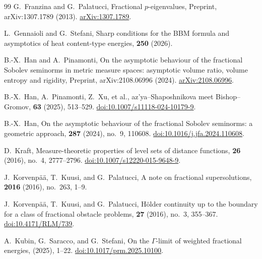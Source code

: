\documentclass[reqno,11pt]{amsart}
\numberwithin{equation}{section}
\theoremstyle{definition} %
\theoremstyle{plain}
\theoremstyle{definition}
\theoremstyle{remark}
\begin{document}
\begin{thebibliography}{99}
G.~Franzina and G.~Palatucci,
\newblock Fractional $p$-eigenvalues,
\newblock Preprint, arXiv:1307.1789 (2013).
\newblock \href{https://arxiv.org/abs/1307.1789}{arXiv:1307.1789}.

L.~Gennaioli and G.~Stefani,
\newblock Sharp conditions for the {BBM} formula and asymptotics of heat content-type energies,
 \textbf{250} (2026).


B.-X.~Han and A.~Pinamonti,
\newblock On the asymptotic behaviour of the fractional {S}obolev seminorms in metric measure spaces: asymptotic volume ratio, volume entropy and rigidity,
\newblock Preprint, arXiv:2108.06996 (2024).
\newblock \href{https://arxiv.org/abs/2108.06996}{arXiv:2108.06996}.

B.-X.~Han, A.~Pinamonti, Z.~Xu, et al.,
az'ya--{S}haposhnikova meet {B}ishop--{G}romov,
 \textbf{63} (2025), 513--529.
\newblock \href{https://doi.org/10.1007/s11118-024-10179-9}{doi:10.1007/s11118-024-10179-9}.

B.-X.~Han,
\newblock On the asymptotic behaviour of the fractional {S}obolev seminorms: a geometric approach,
 \textbf{287} (2024), no.~9, 110608.
\newblock \href{https://doi.org/10.1016/j.jfa.2024.110608}{doi:10.1016/j.jfa.2024.110608}.

D.~Kraft,
\newblock Measure-theoretic properties of level sets of distance functions,
 \textbf{26} (2016), no.~4, 2777--2796.
\newblock \href{https://doi.org/10.1007/s12220-015-9648-9}{doi:10.1007/s12220-015-9648-9}.

J.~Korvenp{\"a}{\"a}, T.~Kuusi, and G.~Palatucci,
\newblock A note on fractional supersolutions,
 \textbf{2016} (2016), no.~263, 1--9.

J.~Korvenp{\"a}{\"a}, T.~Kuusi, and G.~Palatucci,
\newblock H{\"o}lder continuity up to the boundary for a class of fractional obstacle problems,
 \textbf{27} (2016), no.~3, 355--367.
\newblock \href{https://doi.org/10.4171/RLM/739}{doi:10.4171/RLM/739}.

A.~Kubin, G.~Saracco, and G.~Stefani,
\newblock On the $\Gamma$-limit of weighted fractional energies,
 (2025), 1--22.
\newblock \href{https://doi.org/10.1017/prm.2025.10100}{doi:10.1017/prm.2025.10100}.


\end{thebibliography}
\end{document}

